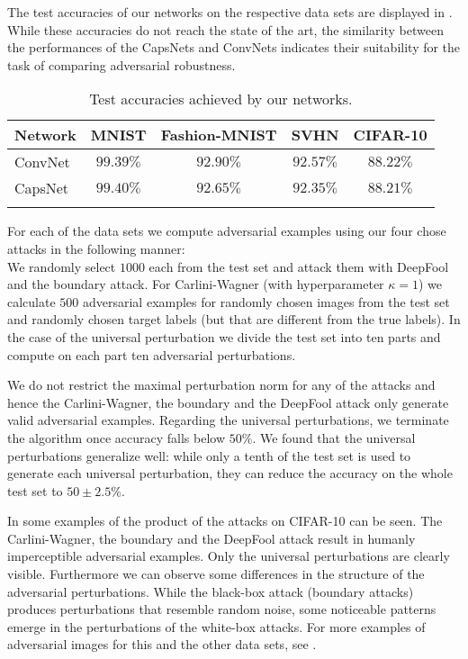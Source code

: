 The test accuracies of our networks on the respective data sets are displayed in .
While these accuracies do not reach the state of the art, the similarity between the performances of the CapsNets and ConvNets indicates their suitability for the task of comparing adversarial robustness.

\begin{table}	
	\centering
	\begin{tabular}{lcccc}
		\toprule
		Network       & MNIST & Fashion-MNIST & SVHN & CIFAR-10  \\
		\midrule
		ConvNet           & $99.39\%$ & $92.90\%$ & $92.57\%$ & $88.22\%$ \\
		CapsNet           & $99.40\%$ & $92.65\%$ & $92.35\%$ & $88.21\%$ \\
		\bottomrule\\
	\end{tabular}
	\caption{Test accuracies achieved by our networks.}
	\label{tab:accuracies}
\end{table}

For each of the data sets we compute adversarial examples using our four chose attacks in the following manner: \\
We randomly select $1000$ each from the test set and attack them with DeepFool and the boundary attack.
For Carlini-Wagner (with hyperparameter $\kappa=1$) we calculate $500$ adversarial examples for randomly chosen images from the test set and randomly chosen target labels (but that are different from the true labels).
In the case of the universal perturbation we divide the test set into ten parts and compute on each part ten adversarial perturbations.

We do not restrict the maximal perturbation norm for any of the attacks and hence the Carlini-Wagner, the boundary and the DeepFool attack only generate valid adversarial examples.
Regarding the universal perturbations, we terminate the algorithm once accuracy falls below $50\%$.
We found that the universal perturbations generalize well: while only a tenth of the test set is used to generate each universal perturbation, they can reduce the accuracy on the whole test set to $50\pm2.5\%$.

In  some examples of the product of the attacks on CIFAR-10 can be seen.
The Carlini-Wagner, the boundary and the DeepFool attack result in humanly imperceptible adversarial examples.
Only the universal perturbations are clearly visible.
Furthermore we can observe some differences in the structure of the adversarial perturbations.
While the black-box attack (boundary attacks) produces perturbations that resemble random noise, some noticeable patterns emerge in the perturbations of the white-box attacks.
For more examples of adversarial images for this and the other data sets, see .

